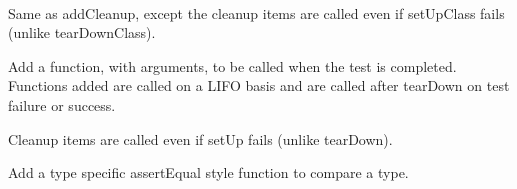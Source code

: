 \documentclass[letterpaper,10pt,english]{sphinxmanual}
\begin{document}
\begin{fulllineitems}
\begin{savenotes}
\begin{tabulary}{\linewidth}[t]{}
\\
\sphinxbottomrule
\end{tabulary}
\sphinxtableafterendhook\par
\sphinxattableend\end{savenotes}

\begin{fulllineitems}
\label{\detokenize{_autosummary/tests.test_unit.test_df:tests.test_unit.test_df.addClassCleanup}}
\pysigstartsignatures
{}
\pysigstopsignatures
\sphinxAtStartPar
Same as addCleanup, except the cleanup items are called even if
setUpClass fails (unlike tearDownClass).

\end{fulllineitems}


\begin{fulllineitems}
\label{\detokenize{_autosummary/tests.test_unit.test_df:tests.test_unit.test_df.addCleanup}}
\pysigstartsignatures
{}
\pysigstopsignatures
\sphinxAtStartPar
Add a function, with arguments, to be called when the test is
completed. Functions added are called on a LIFO basis and are
called after tearDown on test failure or success.

\sphinxAtStartPar
Cleanup items are called even if setUp fails (unlike tearDown).

\end{fulllineitems}


\begin{fulllineitems}
\label{\detokenize{_autosummary/tests.test_unit.test_df:tests.test_unit.test_df.addTypeEqualityFunc}}
\pysigstartsignatures
{}
\pysigstopsignatures
\sphinxAtStartPar
Add a type specific assertEqual style function to compare a type.


\end{fulllineitems}
\end{fulllineitems}
\end{document}
